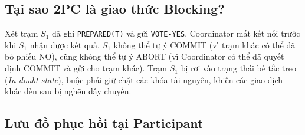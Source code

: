\documentclass[12pt,a4paper]{report}
\begin{document}
\subsection{Tại sao 2PC là giao thức Blocking?}
Xét trạm $S_1$ đã ghi \texttt{PREPARED(T)} và gửi \texttt{VOTE-YES}. Coordinator mất kết nối trước khi $S_1$ nhận được kết quả. $S_1$ không thể tự ý COMMIT (vì trạm khác có thể đã bỏ phiếu NO), cũng không thể tự ý ABORT (vì Coordinator có thể đã quyết định COMMIT và gửi cho trạm khác). Trạm $S_1$ bị rơi vào trạng thái bế tắc treo (\textit{In-doubt state}), buộc phải giữ chặt các khóa tài nguyên, khiến các giao dịch khác đến sau bị nghẽn dây chuyền.

\subsection{Lưu đồ phục hồi tại Participant}
\end{document}
